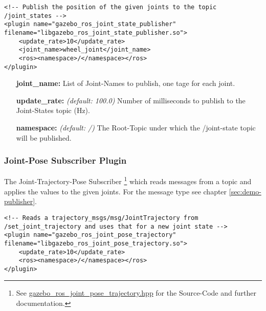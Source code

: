 \lstset{language=xml}
\begin{lstlisting}[label=code:xml-urdf-joint-state, caption={[URDF-Section for Joint-States]Loading the \Gls{gazebo}-Plugin and publish \textit{wheel\_joint} to the \textit{/joint\_states} topic.}]
<!-- Publish the position of the given joints to the topic /joint_states -->
<plugin name="gazebo_ros_joint_state_publisher" filename="libgazebo_ros_joint_state_publisher.so">
    <update_rate>10</update_rate>
    <joint_name>wheel_joint</joint_name>
    <ros><namespace>/</namespace></ros>
</plugin>
\end{lstlisting}

\begin{enumerate}
    \item[\textbf{joint\_name:}] List of Joint-Names to publish, one tage for each joint.
    \item[\textbf{update\_rate:}] \textit{(default: 100.0)} Number of milliseconds to publish to the Joint-States topic (Hz).
    \item[\textbf{namespace:}] \textit{(default: /)} The Root-Topic under which the /joint-state topic will be published.
\end{enumerate}


\subsubsection[Joint-Pose]{Joint-Pose Subscriber Plugin} \label{sec:demo-urdf-model-joint-pose}

The Joint-Trajectory-Pose Subscriber \footnote{See \href{https://github.com/ros-simulation/gazebo_ros_pkgs/blob/ros2/gazebo_plugins/include/gazebo_plugins/gazebo_ros_joint_pose_trajectory.hpp}{gazebo\_ros\_joint\_pose\_trajectory.hpp} for the Source-Code and further documentation.} which reads messages from a topic and applies the values to the given joints.
For the message type see chapter \ref{sec:demo-publisher}.

\lstset{language=xml}
\begin{lstlisting}[label=code:xml-urdf-joint-pose, caption={[URDF-Section for Joint-Trajectory Poses]Loading the \Gls{gazebo}-Plugin and subscribe to the \textit{set\_joint\_trajectory} topic to receive new positions for the given joints in the message.}]
<!-- Reads a trajectory_msgs/msg/JointTrajectory from /set_joint_trajectory and uses that for a new joint state -->
<plugin name="gazebo_ros_joint_pose_trajectory" filename="libgazebo_ros_joint_pose_trajectory.so">
    <update_rate>10</update_rate>
    <ros><namespace>/</namespace></ros>
</plugin>
\end{lstlisting}

